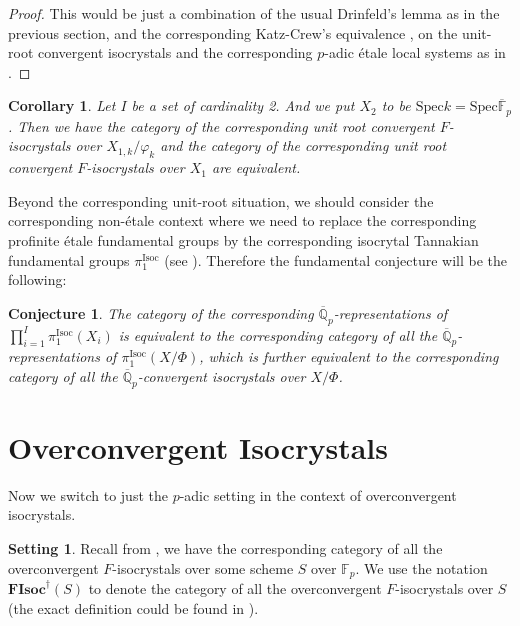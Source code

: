 \documentclass[11pt]{book}
\newtheorem{corollary}[theorem]{Corollary}
\newtheorem{conjecture}[theorem]{Conjecture}
\theoremstyle{definition}
\numberwithin{equation}{section}
\newtheorem{setting}[theorem]{Setting}
\begin{document}
\begin{proof}
This would be just a combination of the usual Drinfeld's lemma as in the previous section, and the corresponding Katz-Crew's equivalence \cite{Ka}, \cite{Cr2} on the unit-root convergent isocrystals and the corresponding $p$-adic \'etale local systems as in \cite[Theorem 2.1]{Cr2}.	
\end{proof}



\begin{corollary}  \label{corollary2.4}
Let $I$ be a set of cardinality 2. And we put $X_2$ to be $\mathrm{Spec} k=\mathrm{Spec}\overline{\mathbb{F}}_p$. Then we have the category of the corresponding unit root convergent $F$-isocrystals over $X_{1,k}/\varphi_k$ and the category of the corresponding unit root convergent $F$-isocrystals over $X_1$ are equivalent.	
\end{corollary}


\indent Beyond the corresponding unit-root situation, we should consider the corresponding non-\'etale context where we need to replace the corresponding profinite \'etale fundamental groups by the corresponding isocrytal Tannakian fundamental groups $\pi^\mathrm{Isoc}_1$ (see \cite[Appendix B]{DK}). Therefore the fundamental conjecture will be the following:

\begin{conjecture}
The category of the corresponding $\overline{\mathbb{Q}}_p$-representations of $\prod_{i=1}^I \pi^\mathrm{Isoc}_1(X_i)$ is equivalent to the corresponding category of all the $\overline{\mathbb{Q}}_p$-representations of $\pi^\mathrm{Isoc}_1(X/\Phi)$, which is further equivalent to the corresponding category of all the $\overline{\mathbb{Q}}_p$-convergent isocrystals over $X/\Phi$.
\end{conjecture}






\newpage
\section{Overconvergent Isocrystals}


\indent Now we switch to just the $p$-adic setting in the context of overconvergent isocrystals. 


\begin{setting}
Recall from \cite[Definition 2.7]{Ked1}, we have the corresponding category of all the overconvergent $F$-isocrystals over some scheme $S$ over $\mathbb{F}_p$. We use the notation $\textbf{FIsoc}^\dagger(S)$ to denote the category of all the overconvergent $F$-isocrystals over $S$ (the exact definition could be found in \cite[Definition 2.7]{Ked1}).  
\end{setting}
\end{document}

